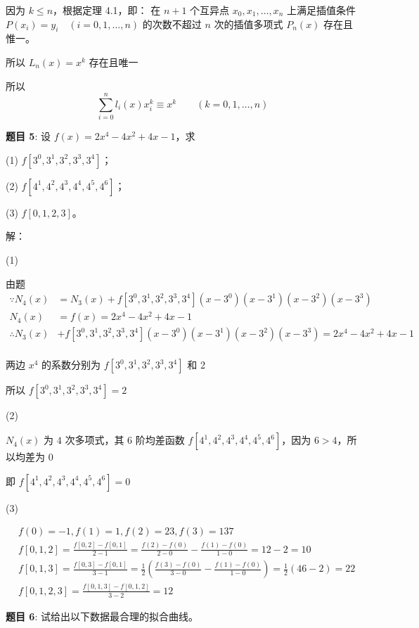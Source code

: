\documentclass{article}
\begin{document}
因为 $k\leq n$，根据定理 4.1，即：
在 $n + 1$ 个互异点 $x_0, x_1, \ldots, x_n$ 上满足插值条件 $P(x_i) = y_i \quad (i = 0, 1, \ldots, n)$ 的次数不超过 $n$ 次的插值多项式 $P_n(x)$ 存在且惟一。

所以 $L_n(x) = x^k$ 存在且唯一

所以
$$
\sum\limits_{i = 0}^{n}l_i(x)x_i^k \equiv x^k \quad\quad (k = 0, 1, \ldots, n)
$$

\noindent\textbf{题目 5}: 设 $f(x) = 2x^4 - 4x^2 + 4x - 1$，求

(1) $f[3^0, 3^1, 3^2, 3^3, 3^4]$；

(2) $f[4^1, 4^2, 4^3, 4^4, 4^5, 4^6]$；

(3) $f[0, 1, 2, 3]$。

\noindent 解：

\noindent (1)

由题
$$
\begin{aligned}
\because N_4(x) &= N_3(x) + f[3^0, 3^1, 3^2, 3^3, 3^4](x - 3^0)(x - 3^1)(x - 3^2)(x - 3^3) \\
N_4(x) &= f(x) = 2x^4 - 4x^2 + 4x - 1 \\
\therefore N_3(x) &+ f[3^0, 3^1, 3^2, 3^3, 3^4](x - 3^0)(x - 3^1)(x - 3^2)(x - 3^3) = 2x^4 - 4x^2 + 4x - 1 \\
\end{aligned}
$$

两边 $x^4$ 的系数分别为 $f[3^0, 3^1, 3^2, 3^3, 3^4]$ 和 2

所以 $f[3^0, 3^1, 3^2, 3^3, 3^4] = 2$

\noindent (2)

$N_4(x)$ 为 $4$ 次多项式，其 6 阶均差函数 $f[4^1, 4^2, 4^3, 4^4, 4^5, 4^6]$，因为 $6 > 4$，所以均差为 $0$

即 $f[4^1, 4^2, 4^3, 4^4, 4^5, 4^6] = 0$

\noindent (3)

$$
\begin{aligned}
&f(0) = -1, f(1) = 1, f(2) = 23, f(3) = 137 \\
&f[0, 1, 2] = \frac{f[0, 2] - f[0, 1]}{2 - 1}= \frac{f(2) - f(0)}{2 - 0} - \frac{f(1) - f(0)}{1 - 0} = 12 - 2 = 10 \\
&f[0, 1, 3] = \frac{f[0, 3] - f[0, 1]}{3 - 1} = \frac{1}{2}(\frac{f(3) - f(0)}{3 - 0} - \frac{f(1) - f(0)}{1 - 0}) = \frac{1}{2}(46 - 2) = 22 \\
&f[0, 1, 2, 3] = \frac{f[0, 1, 3] - f[0, 1, 2]}{3 - 2} = 12
\end{aligned}
$$

\noindent\textbf{题目 6}: 试给出以下数据最合理的拟合曲线。
\end{document}
